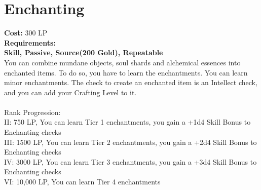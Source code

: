 \section{Enchanting}\label{perk:enchanting}
\textbf{Cost:} 300 LP\\
\textbf{Requirements:} ~\\
\textbf{Skill, Passive, Source(200 Gold), Repeatable}\\
You can combine mundane objects, soul shards and alchemical essences into enchanted items.
To do so, you have to learn the enchantments.
You can learn minor enchantments.
The check to create an enchanted item is an Intellect check, and you can add your Crafting Level to it.\\
\\
Rank Progression:\\
II: 750 LP, You can learn Tier 1 enchantments, you gain a +1d4 Skill Bonus to Enchanting checks\\
III: 1500 LP, You can learn Tier 2 enchantments, you gain a +2d4 Skill Bonus to Enchanting checks\\
IV: 3000 LP, You can learn Tier 3 enchantments, you gain a +3d4 Skill Bonus to Enchanting checks\\
VI: 10,000 LP, You can learn Tier 4 enchantments\\
